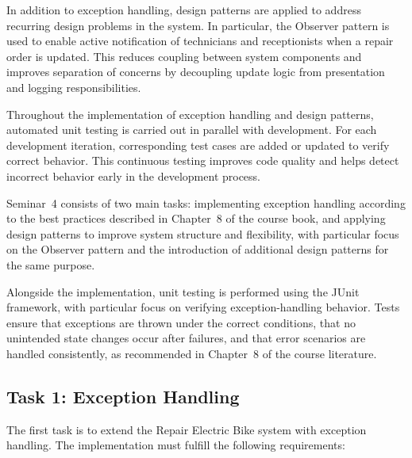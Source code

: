 \documentclass[a4paper]{scrartcl}
\begin{document}
In addition to exception handling, design patterns are applied to address recurring design problems in the system. In particular, the Observer pattern is used to enable active notification of technicians and receptionists when a repair order is updated. This reduces coupling between system components and improves separation of concerns by decoupling update logic from presentation and logging responsibilities.

Throughout the implementation of exception handling and design patterns, automated unit testing is carried out in parallel with development. For each development iteration, corresponding test cases are added or updated to verify correct behavior. This continuous testing improves code quality and helps detect incorrect behavior early in the development process.

Seminar~4 consists of two main tasks: implementing exception handling according to the best practices described in Chapter~8 of the course book, and applying design patterns to improve system structure and flexibility, with particular focus on the Observer pattern and the introduction of additional design patterns for the same purpose.

Alongside the implementation, unit testing is performed using the JUnit framework, with particular focus on verifying exception-handling behavior. Tests ensure that exceptions are thrown under the correct conditions, that no unintended state changes occur after failures, and that error scenarios are handled consistently, as recommended in Chapter~8 of the course literature.

\subsection*{Task 1: Exception Handling}

The first task is to extend the Repair Electric Bike system with exception handling. The implementation must fulfill the following requirements:
\end{document}
